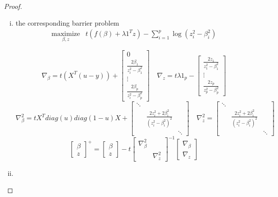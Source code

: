 \documentclass{article}
\theoremstyle{remark}
\theoremstyle{definition}
\newcommand{\maximize}{\mathop{\mathrm{maximize}}}
\newcommand{\maximizewrt}[1]{\underset{#1}{\maximize}}
\begin{document}
\begin{proof}
\begin{enumerate}[(a)]
\begin{enumerate}[(i)]
    \item the corresponding barrier problem
    \begin{equation*}
    \begin{array}{cc}
    \maximizewrt{\beta,z} & t\left( f(\beta)+\lambda 1^Tz\right) -\sum_{i=1}^p \log(z_i^2-\beta_i^2) 
    \end{array}
    \end{equation*}
    
    \[\nabla_{\beta} = t\left(X^T(u-y)\right)+\begin{bmatrix}
    0\\
    \frac{2\beta_1}{z_i^2-\beta_1^2}\\
    \vdots\\
    \frac{2\beta_p}{z_i^2-\beta_p^2}
    \end{bmatrix}
    \quad 
    \nabla_{z} =t\lambda 1_p-\begin{bmatrix}
    \frac{2z_1}{z_1^2-\beta_1^2}\\
    \vdots\\
    \frac{2z_p}{z_p^2-\beta_p^2}
    \end{bmatrix}\]
    \[\nabla^2_{\beta}= tX^Tdiag(u)diag(1-u)X+\begin{bmatrix}
    \ddots & & \\
    & \frac{2z_i^2+2\beta_i^2}{(z_i^2-\beta_i^2)^2}&\\
    & & \ddots
    \end{bmatrix}\quad
    \nabla^2_{z}=\begin{bmatrix}
    \ddots & & \\
    & \frac{2z_i^2+2\beta_i^2}{(z_i^2-\beta_i^2)^2}&\\
    & & \ddots
    \end{bmatrix}\]
    \[\begin{bmatrix}
    \beta\\
    z\end{bmatrix}^+=\begin{bmatrix}
    \beta\\
    z
    \end{bmatrix}-t\begin{bmatrix}
    \nabla^2_{\beta}& \\
    & \nabla^2_{z}
    \end{bmatrix}^{-1} \begin{bmatrix}
    \nabla_{\beta}\\
    \nabla_z
    \end{bmatrix}\]
    
    \item 
\end{enumerate}
\end{enumerate}
\end{proof}
\end{document}
